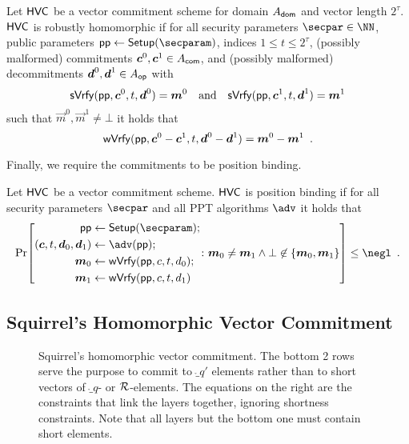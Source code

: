 \begin{definition} \label{def:malhomhvc}
  Let $\mathsf{HVC}$ be a vector commitment scheme for domain $A_{\mathsf{dom}}$ and vector length $2^\tau$. %
  $\mathsf{HVC}$ is robustly homomorphic if for all security parameters $\secpar\in\NN$, public parameters $\params\gets\setup(\secparam)$, indices $1\leq t \leq 2^\tau$, (possibly malformed) commitments $\boldsymbol{c}^0,\boldsymbol{c}^1 \in A_{\mathsf{com}}$, and (possibly malformed) decommitments $\boldsymbol{d}^0,\boldsymbol{d}^1\in A_{\mathsf{op}}$ with
  \[
    \mathsf{sVrfy}(\mathsf{pp},\boldsymbol{c}^0, t,\boldsymbol{d}^0)=\boldsymbol{m}^0 \quad \text{and} \quad \mathsf{sVrfy}(\mathsf{pp},\boldsymbol{c}^1, t,\boldsymbol{d}^1)=\boldsymbol{m}^1
  \]
  such that $\vec{m}^0,\vec{m}^1\neq \bot$ it holds that
  \[
    \mathsf{wVrfy}(\mathsf{pp},\boldsymbol{c}^0 - \boldsymbol{c}^1, t,\boldsymbol{d}^0 - \boldsymbol{d}^1)=\boldsymbol{m}^0 - \boldsymbol{m}^1\enspace.
  \]
\end{definition}
%
Finally, we require the commitments to be position binding.
\begin{definition}\label{def:position_binding}
  Let $\mathsf{HVC}$ be a vector commitment scheme.
  $\mathsf{HVC}$ is position binding if for all security parameters $\secpar$ and all PPT algorithms $\adv$ it holds that
  \[
    \Pr\mleft[
      \begin{aligned}
      \params\gets{}&\setup(\secparam);\\
      (\vec{c},t,\vec{d}_0,\vec{d}_1) \gets{}& \adv(\params);\\
      \vec{m}_0 \gets{}& \wverify(\params,c,t,d_0);\\
      \vec{m}_1 \gets{}& \wverify(\params,c,t,d_1)
      \end{aligned}\colon
      \vec{m}_0\neq \vec{m}_1 \land \bot\not\in\{\vec{m}_0,\vec{m}_1\}
    \mright]\leq \negl\enspace.
  \]
\end{definition}

\subsection{Squirrel's Homomorphic Vector Commitment}\label{subsec:squirrelrecap}

\begin{figure}
\centering

\caption{Squirrel's homomorphic vector commitment. The bottom 2 rows serve the purpose to commit to $\ring_{q'}$ elements rather than to short vectors of $\ring_q$- or $\mathcal{R}$-elements. The equations on the right are the constraints that link the layers together, ignoring shortness constraints. Note that all layers but the bottom one must contain short elements.}\label{fig:squirreltree}
\end{figure}

